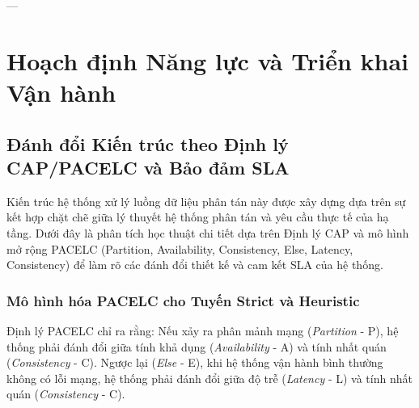 \documentclass[12pt,a4paper]{article}
\begin{document}
---

\section{Hoạch định Năng lực và Triển khai Vận hành}

\subsection{Đánh đổi Kiến trúc theo Định lý CAP/PACELC và Bảo đảm SLA}
Kiến trúc hệ thống xử lý luồng dữ liệu phân tán này được xây dựng dựa trên sự kết hợp chặt chẽ giữa lý thuyết hệ thống phân tán và yêu cầu thực tế của hạ tầng. Dưới đây là phân tích học thuật chi tiết dựa trên Định lý CAP và mô hình mở rộng PACELC (Partition, Availability, Consistency, Else, Latency, Consistency) để làm rõ các đánh đổi thiết kế và cam kết SLA của hệ thống.

\subsubsection{Mô hình hóa PACELC cho Tuyến Strict và Heuristic}
Định lý PACELC chỉ ra rằng: Nếu xảy ra phân mảnh mạng (\textit{Partition} - P), hệ thống phải đánh đổi giữa tính khả dụng (\textit{Availability} - A) và tính nhất quán (\textit{Consistency} - C). Ngược lại (\textit{Else} - E), khi hệ thống vận hành bình thường không có lỗi mạng, hệ thống phải đánh đổi giữa độ trễ (\textit{Latency} - L) và tính nhất quán (\textit{Consistency} - C).
\end{document}
